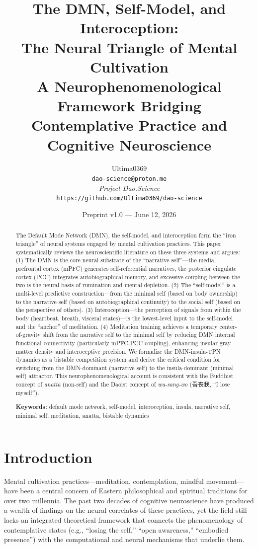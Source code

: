 \documentclass[11pt,a4paper]{article}
\title{\textbf{The DMN, Self-Model, and Interoception:\\
The Neural Triangle of Mental Cultivation}\\
\large A Neurophenomenological Framework Bridging Contemplative Practice and Cognitive Neuroscience}
\author{Ultima0369\\
\texttt{dao-science@proton.me}\\[4pt]
\textit{Project Dao.Science}\\
\texttt{https://github.com/Ultima0369/dao-science}}
\date{Preprint v1.0 — June 12, 2026}
\begin{document}
\maketitle

\begin{abstract}
The Default Mode Network (DMN), the self-model, and interoception form the ``iron triangle'' of neural systems engaged by mental cultivation practices. This paper systematically reviews the neuroscientific literature on these three systems and argues: (1) The DMN is the core neural substrate of the ``narrative self''---the medial prefrontal cortex (mPFC) generates self-referential narratives, the posterior cingulate cortex (PCC) integrates autobiographical memory, and excessive coupling between the two is the neural basis of rumination and mental depletion. (2) The ``self-model'' is a multi-level predictive construction---from the minimal self (based on body ownership) to the narrative self (based on autobiographical continuity) to the social self (based on the perspective of others). (3) Interoception---the perception of signals from within the body (heartbeat, breath, visceral states)---is the lowest-level input to the self-model and the ``anchor'' of meditation. (4) Meditation training achieves a temporary center-of-gravity shift from the narrative self to the minimal self by reducing DMN internal functional connectivity (particularly mPFC-PCC coupling), enhancing insular gray matter density and interoceptive precision. We formalize the DMN-insula-TPN dynamics as a bistable competition system and derive the critical condition for switching from the DMN-dominant (narrative self) to the insula-dominant (minimal self) attractor. This neurophenomenological account is consistent with the Buddhist concept of \textit{anatta} (non-self) and the Daoist concept of \textit{wu-sang-wo} (吾丧我, ``I lose myself'').

\textbf{Keywords:} default mode network, self-model, interoception, insula, narrative self, minimal self, meditation, anatta, bistable dynamics
\end{abstract}

\section{Introduction}

Mental cultivation practices---meditation, contemplation, mindful movement---have been a central concern of Eastern philosophical and spiritual traditions for over two millennia. The past two decades of cognitive neuroscience have produced a wealth of findings on the neural correlates of these practices, yet the field still lacks an integrated theoretical framework that connects the phenomenology of contemplative states (e.g., ``losing the self,'' ``open awareness,'' ``embodied presence'') with the computational and neural mechanisms that underlie them.
\end{document}
